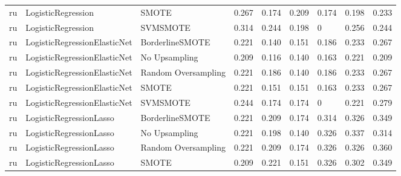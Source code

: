 \begin{tabular}{lllllllll}
      ru &              LogisticRegression &                         SMOTE & 0.267 &                     0.174 &                 0.209 &                  0.174 &                                   0.198 &     0.233 \\
      ru &              LogisticRegression &                      SVMSMOTE & 0.314 &                     0.244 &                 0.198 &                      0 &                                   0.256 &     0.244 \\
      ru &    LogisticRegressionElasticNet &               BorderlineSMOTE & 0.221 &                     0.140 &                 0.151 &                  0.186 &                                   0.233 &     0.267 \\
      ru &    LogisticRegressionElasticNet &                 No Upsampling & 0.209 &                     0.116 &                 0.140 &                  0.163 &                                   0.221 &     0.209 \\
      ru &    LogisticRegressionElasticNet &           Random Oversampling & 0.221 &                     0.186 &                 0.140 &                  0.186 &                                   0.233 &     0.267 \\
      ru &    LogisticRegressionElasticNet &                         SMOTE & 0.221 &                     0.151 &                 0.151 &                  0.163 &                                   0.233 &     0.267 \\
      ru &    LogisticRegressionElasticNet &                      SVMSMOTE & 0.244 &                     0.174 &                 0.174 &                      0 &                                   0.221 &     0.279 \\
      ru &         LogisticRegressionLasso &               BorderlineSMOTE & 0.221 &                     0.209 &                 0.174 &                  0.314 &                                   0.326 &     0.349 \\
      ru &         LogisticRegressionLasso &                 No Upsampling & 0.221 &                     0.198 &                 0.140 &                  0.326 &                                   0.337 &     0.314 \\
      ru &         LogisticRegressionLasso &           Random Oversampling & 0.221 &                     0.209 &                 0.174 &                  0.326 &                                   0.326 &     0.360 \\
      ru &         LogisticRegressionLasso &                         SMOTE & 0.209 &                     0.221 &                 0.151 &                  0.326 &                                   0.302 &     0.349 \\

\end{tabular}
